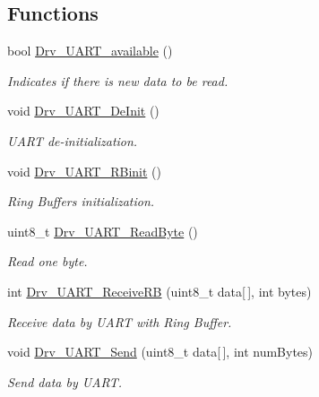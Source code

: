 \subsection*{Functions}
\begin{DoxyCompactItemize}
\item 
bool \hyperlink{group__UART__Library_ga7a96fcb2dfc23bcf106ef05a6e348eb4}{Drv\+\_\+\+U\+A\+R\+T\+\_\+available} ()
\begin{DoxyCompactList}\small\item\em Indicates if there is new data to be read. \end{DoxyCompactList}\item 
void \hyperlink{group__UART__Library_ga4d7777f8692bb7fdf17e975025bfbf8a}{Drv\+\_\+\+U\+A\+R\+T\+\_\+\+De\+Init} ()
\begin{DoxyCompactList}\small\item\em U\+A\+RT de-\/initialization. \end{DoxyCompactList}\item 
void \hyperlink{group__UART__Library_gae34ea7abfefbe2834e8b17aec557a30d}{Drv\+\_\+\+U\+A\+R\+T\+\_\+\+R\+Binit} ()
\begin{DoxyCompactList}\small\item\em Ring Buffers initialization. \end{DoxyCompactList}\item 
uint8\+\_\+t \hyperlink{group__UART__Library_ga0332d0b4b9dee94a3464a62ab776b594}{Drv\+\_\+\+U\+A\+R\+T\+\_\+\+Read\+Byte} ()
\begin{DoxyCompactList}\small\item\em Read one byte. \end{DoxyCompactList}\item 
int \hyperlink{group__UART__Library_gac8130d4c4c932205906c516ff6afe684}{Drv\+\_\+\+U\+A\+R\+T\+\_\+\+Receive\+RB} (uint8\+\_\+t data\mbox{[}$\,$\mbox{]}, int bytes)
\begin{DoxyCompactList}\small\item\em Receive data by U\+A\+RT with Ring Buffer. \end{DoxyCompactList}\item 
void \hyperlink{group__UART__Library_ga3cd9c151bd9649652b8f6c7a8a371f4b}{Drv\+\_\+\+U\+A\+R\+T\+\_\+\+Send} (uint8\+\_\+t data\mbox{[}$\,$\mbox{]}, int num\+Bytes)
\begin{DoxyCompactList}\small\item\em Send data by U\+A\+RT. \end{DoxyCompactList}\item 

\end{DoxyCompactItemize}
